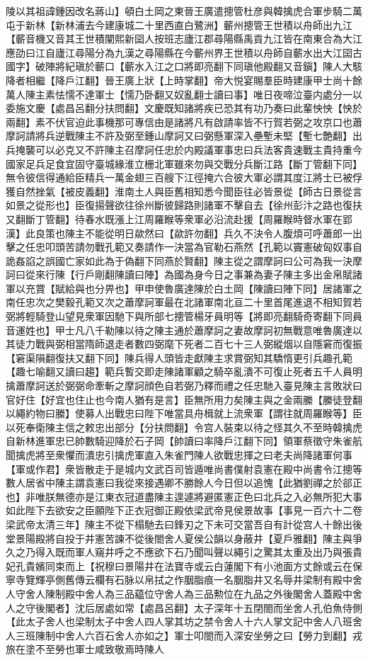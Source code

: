 陵以其祖諱鍾因改名蔣山】頓白土岡之東晉王廣遣摠管杜彦與韓擒虎合軍步騎二萬屯于新林【新林浦去今建康城二十里西直白鷺洲】蘄州摠管王世積以舟師出九江【蘄音機又音其王世積闡熙新囶人按班志廬江郡尋陽縣禹貢九江皆在南東合為大江應劭曰江自廬江尋陽分為九漢之尋陽縣在今蘄州界王世積以舟師自蘄水出大江囶古國字】破陣將紀瑱於蘄口【蘄水入江之口將即亮翻下同瑱他殿翻又音鎭】陳人大駭降者相繼【降戶江翻】晉王廣上狀【上時掌翻】帝大悦宴賜羣臣時建康甲士尚十餘萬人陳主素怯懦不達軍士【懦乃卧翻又奴亂翻士讀曰事】唯日夜啼泣臺内處分一以委施文慶【處昌呂翻分扶問翻】文慶既知諸將疾已恐其有功乃奏曰此輩怏怏【怏於兩翻】素不伏官迫此事機那可專信由是諸將凡有啟請率皆不行賀若弼之攻京口也蕭摩訶請將兵逆戰陳主不許及弼至鍾山摩訶又曰弼懸軍深入壘塹未堅【塹七艶翻】出兵掩襲可以必克又不許陳主召摩訶任忠於内殿議軍事忠曰兵法客貴速戰主貴持重今國家足兵足食宜固守臺城緣淮立栅北軍雖來勿與交戰分兵斷江路【斷丁管翻下同】無令彼信得通給臣精兵一萬金翅三百艘下江徑掩六合彼大軍必謂其度江將士已被俘獲自然挫氣【被皮義翻】淮南土人與臣舊相知悉今聞臣往必皆景從【師古日景從言如景之從形也】臣復揚聲欲往徐州斷彼歸路則諸軍不擊自去【徐州彭汴之路也復扶又翻斷丁管翻】待春水既漲上江周羅睺等衆軍必沿流赴援【周羅睺時督水軍在郢漢】此良策也陳主不能從明日歘然曰【歘許勿翻】兵久不決令人腹煩可呼蕭郎一出擊之任忠叩頭苦請勿戰孔範又奏請作一決當為官勒石燕然【孔範以竇憲破匈奴事自詭姦諂之誤國亡家如此為于偽翻下同燕於賢翻】陳主從之謂摩訶曰公可為我一決摩訶曰從來行陳【行戶剛翻陳讀曰陣】為國為身今日之事兼為妻子陳主多出金帛賦諸軍以充賞【賦給與也分畀也】甲申使魯廣達陳於白土岡【陳讀曰陣下同】居諸軍之南任忠次之樊毅孔範又次之蕭摩訶軍最在北諸軍南北亘二十里首尾進退不相知賀若弼將輕騎登山望見衆軍因馳下與所部七摠管楊牙員明等【將即亮翻騎奇寄翻下同員音運姓也】甲士凡八千勒陳以待之陳主通於蕭摩訶之妻故摩訶初無戰意唯魯廣達以其徒力戰與弼相當隋師退走者數四弼麾下死者二百七十三人弼縱烟以自隱窘而復振【窘渠隕翻復扶又翻下同】陳兵得人頭皆走獻陳主求賞弼知其驕惰更引兵趣孔範【趣七喻翻又讀曰趨】範兵暫交即走陳諸軍顧之騎卒亂潰不可復止死者五千人員明擒蕭摩訶送於弼弼命牽斬之摩訶顔色自若弼乃釋而禮之任忠馳入臺見陳主言敗狀曰官好住【好宜也住止也今南人猶有是言】臣無所用力矣陳主與之金兩縢【縢徒登翻以繩約物曰縢】使募人出戰忠曰陛下唯當具舟楫就上流衆軍【謂往就周羅睺等】臣以死奉衛陳主信之敕忠出部分【分扶問翻】令宫人裝束以待之怪其久不至時韓擒虎自新林進軍忠已帥數騎迎降於石子岡【帥讀曰率降戶江翻下同】領軍蔡徵守朱雀航聞擒虎將至衆懼而潰忠引擒虎軍直入朱雀門陳人欲戰忠揮之曰老夫尚降諸軍何事【軍或作君】衆皆散走于是城内文武百司皆遁唯尚書僕射袁憲在殿中尚書令江摠等數人居省中陳主謂袁憲曰我從來接遇卿不勝餘人今日但以追愧【此猶劉禪之於郤正也】非唯朕無德亦是江東衣冠道盡陳主遑遽將避匿憲正色曰北兵之入必無所犯大事如此陛下去欲安之臣願陛下正衣冠御正殿依梁武帝見侯景故事【事見一百六十二卷梁武帝太清三年】陳主不從下榻馳去曰鋒刃之下未可交當吾自有計從宫人十餘出後堂景陽殿將自投于井憲苦諫不從後閤舍人夏侯公韻以身蔽井【夏戶雅翻】陳主與爭久之乃得入既而軍人窺井呼之不應欲下石乃聞叫聲以繩引之驚其太重及出乃與張貴妃孔貴嬪同束而上【祝穆曰景陽井在法寶寺或云白蓮閣下有小池面方丈餘或云在保寧寺覽輝亭側舊傳云欄有石脉以帛拭之作胭脂痕一名胭脂井又名辱井梁制有殿中舍人守舍人陳制殿中舍人為三品藴位守舍人為三品勲位在九品之外後閣舍人蓋殿中舍人之守後閣者】沈后居處如常【處昌呂翻】太子深年十五閉閤而坐舍人孔伯魚侍側【此太子舍人也梁制太子中舍人四人掌其坊之禁令舍人十六人掌文記中舍人八班舍人三班陳制中舍人六百石舍人亦如之】軍士叩閤而入深安坐勞之曰【勞力到翻】戎旅在塗不至勞也軍士咸致敬焉時陳人
